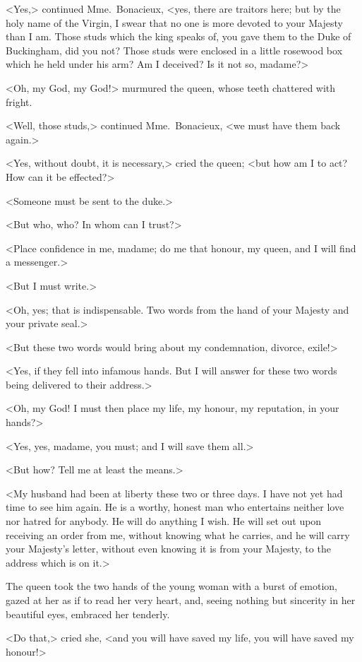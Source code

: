 <Yes,> continued Mme.~Bonacieux, <yes, there are traitors here; but by the holy name of the Virgin, I swear that no one is more devoted to your Majesty than I am. Those studs which the king speaks of, you gave them to the Duke of Buckingham, did you not? Those studs were enclosed in a little rosewood box which he held under his arm? Am I deceived? Is it not so, madame?> 

<Oh, my God, my God!> murmured the queen, whose teeth chattered with fright. 

<Well, those studs,> continued Mme.~Bonacieux, <we must have them back again.> 

<Yes, without doubt, it is necessary,> cried the queen; <but how am I to act? How can it be effected?> 

<Someone must be sent to the duke.> 

<But who, who? In whom can I trust?> 

<Place confidence in me, madame; do me that honour, my queen, and I will find a messenger.> 

<But I must write.> 

<Oh, yes; that is indispensable. Two words from the hand of your Majesty and your private seal.> 

<But these two words would bring about my condemnation, divorce, exile!> 

<Yes, if they fell into infamous hands. But I will answer for these two words being delivered to their address.> 

<Oh, my God! I must then place my life, my honour, my reputation, in your hands?> 

<Yes, yes, madame, you must; and I will save them all.> 

<But how? Tell me at least the means.> 

<My husband had been at liberty these two or three days. I have not yet had time to see him again. He is a worthy, honest man who entertains neither love nor hatred for anybody. He will do anything I wish. He will set out upon receiving an order from me, without knowing what he carries, and he will carry your Majesty's letter, without even knowing it is from your Majesty, to the address which is on it.> 

The queen took the two hands of the young woman with a burst of emotion, gazed at her as if to read her very heart, and, seeing nothing but sincerity in her beautiful eyes, embraced her tenderly. 

<Do that,> cried she, <and you will have saved my life, you will have saved my honour!> 

